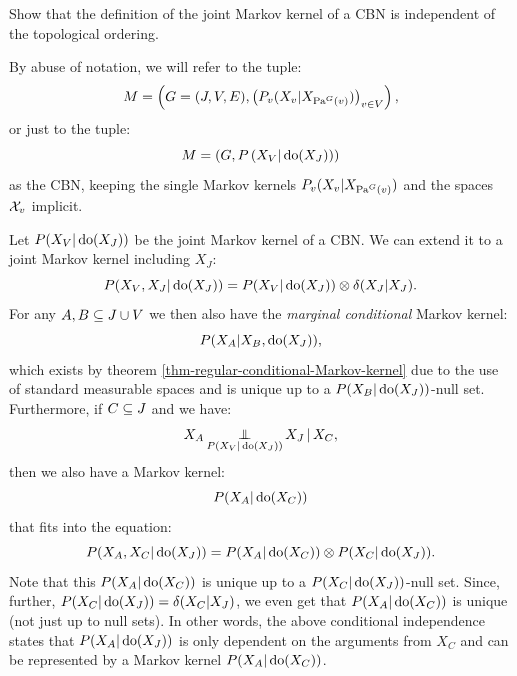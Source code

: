 \begin{Exc}
    Show that the definition of the joint Markov kernel of a CBN is independent of the topological ordering.
\end{Exc}

\begin{Not}
    By abuse of notation, we will refer to the tuple: 
    \[ M= \left ( G=(J,V,E), \left ( P_v(X_v|X_{\mathrm{Pa}^G(v)}) \right )_{v \in V} \right ), \]
    or just to the tuple:
        \[M = \left ( G, P\left ( X_V|\operatorname{do}(X_J)\right )\right )\]
    as the CBN, keeping the single Markov kernels $P_v(X_v|X_{\mathrm{Pa}^G(v)})$ and the spaces $\mathcal{X}_v$ implicit.
\end{Not}

\begin{Rem}
    Let $P(X_V|\operatorname{do}(X_J))$ be the joint Markov kernel of a CBN.
    We can extend it to a joint Markov kernel including $X_J$:
    \[P(X_V,X_J|\operatorname{do}(X_J)) = P(X_V|\operatorname{do}(X_J)) \otimes \delta(X_J|X_J).  \]
    For any $A, B \subseteq J \cup V$ we then also have the \emph{marginal conditional} Markov kernel:
    \[P(X_A|X_B,\operatorname{do}(X_J)),\]
    which exists by theorem \ref{thm-regular-conditional-Markov-kernel} due to the use of standard measurable spaces
    and is unique up to a $P(X_B|\operatorname{do}(X_J))$-null set.\\
    Furthermore, if $C \subseteq J$ and we have: 
    \[X_A \operatorname*{\perp\mkern-11mu\perp}_{P(X_V|\operatorname{do}(X_J))} X_J \operatorname*{|} X_C,\]
    then we also have a Markov kernel:
    \[ P(X_A|\operatorname{do}(X_C)) \]
    that fits into the equation:
    \[ P(X_A,X_C|\operatorname{do}(X_J)) = P(X_A|\operatorname{do}(X_C)) \otimes P(X_C|\operatorname{do}(X_J)). \]
    Note that this $P(X_A|\operatorname{do}(X_C))$ is unique up to a $P(X_C|\operatorname{do}(X_J))$-null set.
    Since, further, $P(X_C|\operatorname{do}(X_J)) = \delta(X_C|X_J)$, 
    we even get that $P(X_A|\operatorname{do}(X_C))$ is unique (not just up to null sets).
    In other words, the above conditional independence states that $P(X_A|\operatorname{do}(X_J))$ is only dependent on the arguments from $X_C$
    and can be represented by a Markov kernel $P(X_A|\operatorname{do}(X_C))$. 
\end{Rem}

